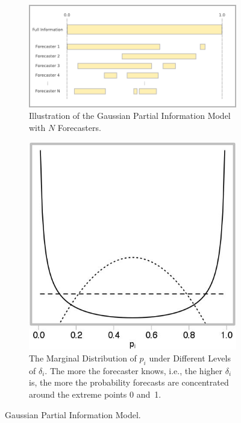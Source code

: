 \documentclass[12pt]{article}
\theoremstyle{definition}
\theoremstyle{definition}
\begin{document}
\begin{figure}[t]
        \centering
        \begin{subfigure}[b]{0.45\textwidth}
   \includegraphics[width = \textwidth]{N=N} %
   \caption{Illustration of the Gaussian Partial Information Model with $N$ Forecasters.}
   \label{diagramN}
\end{subfigure}
        \begin{subfigure}[b]{0.45\textwidth}
   \includegraphics[width = \textwidth]{Marginals} %
\caption{The Marginal Distribution of $p_i$ under Different Levels of 
$\delta_i$.  The more the forecaster knows, i.e., the higher $\delta_i$ is, 
the more the probability forecasts are concentrated around the extreme 
points 0 and~1.}
   \label{diagramN}
\end{subfigure}
\caption{Gaussian Partial Information Model.}
\end{figure}
%
%
%   
\end{document}
